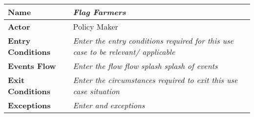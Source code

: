 \begin{center}
\begin{tabular}{|l|>{\raggedright\arraybackslash}m{12cm}|}

    \hline
    \textbf{Name} & \textit{Flag Farmers}\\
    \hline
   	\textbf{Actor} & Policy Maker\\
    \hline
    \textbf{Entry Conditions} & \textit{Enter the entry conditions required for this use case to be relevant/ applicable}\\
    \hline
    \textbf{Events Flow} & \textit{Enter the flow flow splash splash of events}\\
    \hline
    \textbf{Exit Conditions} & \textit{Enter the circumstances required to exit this use case situation}\\
    \hline
    \textbf{Exceptions} & \textit{Enter and exceptions}\\
    \hline
\end{tabular}
\end{center}